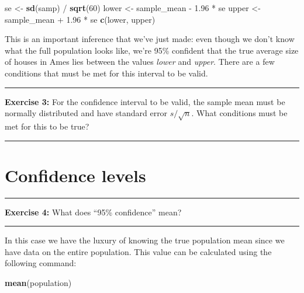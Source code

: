 \documentclass[]{book}
\newenvironment{Shaded}{\begin{snugshade}}{\end{snugshade}}
\newcommand{\KeywordTok}[1]{\textcolor[rgb]{0.13,0.29,0.53}{\textbf{{#1}}}}
\newcommand{\DecValTok}[1]{\textcolor[rgb]{0.00,0.00,0.81}{{#1}}}
\newcommand{\FloatTok}[1]{\textcolor[rgb]{0.00,0.00,0.81}{{#1}}}
\newcommand{\StringTok}[1]{\textcolor[rgb]{0.31,0.60,0.02}{{#1}}}
\newcommand{\NormalTok}[1]{{#1}}
\theoremstyle{definition}
\theoremstyle{definition}
\theoremstyle{definition}
\theoremstyle{remark}
\begin{document}
\begin{Shaded}
\begin{Highlighting}[]
\NormalTok{se <-}\StringTok{ }\KeywordTok{sd}\NormalTok{(samp) /}\StringTok{ }\KeywordTok{sqrt}\NormalTok{(}\DecValTok{60}\NormalTok{)}
\NormalTok{lower <-}\StringTok{ }\NormalTok{sample_mean -}\StringTok{ }\FloatTok{1.96} \NormalTok{*}\StringTok{ }\NormalTok{se}
\NormalTok{upper <-}\StringTok{ }\NormalTok{sample_mean +}\StringTok{ }\FloatTok{1.96} \NormalTok{*}\StringTok{ }\NormalTok{se}
\KeywordTok{c}\NormalTok{(lower, upper)}
\end{Highlighting}
\end{Shaded}

This is an important inference that we've just made: even though we
don't know what the full population looks like, we're 95\% confident
that the true average size of houses in Ames lies between the values
\emph{lower} and \emph{upper}. There are a few conditions that must be
met for this interval to be valid.

\begin{center}\rule{0.5\linewidth}{\linethickness}\end{center}

\textbf{Exercise 3:} For the confidence interval to be valid, the sample
mean must be normally distributed and have standard error
\(s / \sqrt{n}.\) What conditions must be met for this to be true?

\begin{center}\rule{0.5\linewidth}{\linethickness}\end{center}

\section{Confidence levels}\label{confidence-levels}

\begin{center}\rule{0.5\linewidth}{\linethickness}\end{center}

\textbf{Exercise 4:} What does ``95\% confidence'' mean?

\begin{center}\rule{0.5\linewidth}{\linethickness}\end{center}

In this case we have the luxury of knowing the true population mean
since we have data on the entire population. This value can be
calculated using the following command:

\begin{Shaded}
\begin{Highlighting}[]
\KeywordTok{mean}\NormalTok{(population)}
\end{Highlighting}
\end{Shaded}
\end{document}

